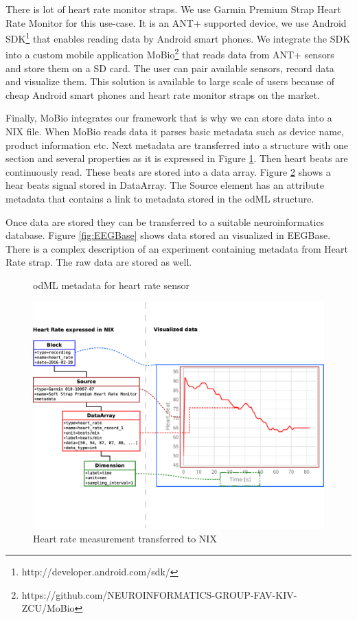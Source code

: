 \documentclass[conference]{IEEEconf}
\begin{document}
There is lot of heart rate monitor straps. We use Garmin Premium Strap Heart Rate Monitor for this use-case. It is an ANT+ supported device, we use Android SDK\footnote{http://developer.android.com/sdk/} that enables reading data by Android smart phones. We integrate the SDK into a custom mobile application MoBio\footnote{https://github.com/NEUROINFORMATICS-GROUP-FAV-KIV-ZCU/MoBio} that reads data from ANT+ sensors and store them on a SD card. The user can pair available sensors, record data and visualize them. This solution is available to large scale of users because of cheap Android smart phones and heart rate monitor straps on the market.

Finally, MoBio integrates our framework that is why we can store data into a NIX file. When MoBio reads data it parses basic metadata such as device name, product information etc. Next metadata are transferred into a structure with one section and several properties as it is expressed in Figure \ref{odML}. Then heart beats are continuously read. These beats are stored into a data array. Figure \ref{NIX-ex} shows a hear beats signal stored in DataArray. The Source element has an attribute metadata that contains a link to metadata stored in the odML structure.

Once data are stored they can be transferred to a suitable neuroinformatics database. Figure \ref{fig:EEGBase} shows data stored an visualized in EEGBase. There is a complex description of an experiment containing metadata from Heart Rate strap. The raw data are stored as well.

\begin{figure}

\caption{\label{odML}odML metadata for heart rate sensor}
\end{figure}

\begin{figure}
\centering\includegraphics[width=13cm]{NIX-example}
\caption{\label{NIX-ex}Heart rate measurement transferred to NIX}
\end{figure}
\end{document}
